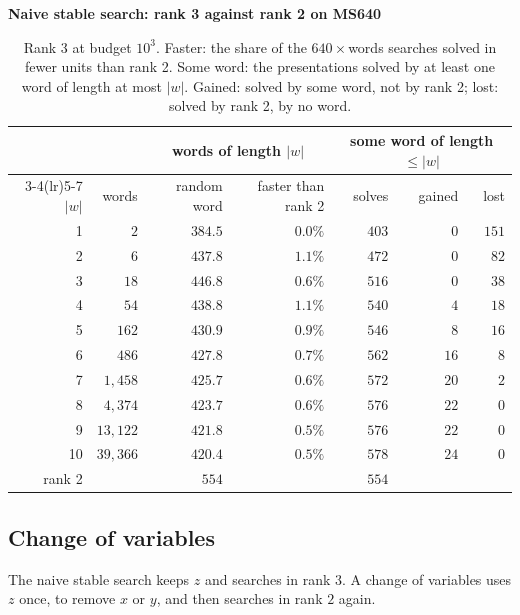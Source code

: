\documentclass[11pt]{article}
\theoremstyle{definition}
\theoremstyle{remark}
\begin{document}
\begin{table}[ht]
\centering
\small
\textbf{Naive stable search: rank 3 against rank 2 on MS640}\par\smallskip
\begin{tabular}{rrrrrrr}
\toprule
& & \multicolumn{2}{c}{words of length $|w|$} & \multicolumn{3}{c}{some word of length $\le|w|$}\\
\cmidrule(lr){3-4}\cmidrule(lr){5-7}
$|w|$ & words & random word & faster than rank 2 & solves & gained & lost\\
\midrule
1 & $2$ & $384.5$ & $0.0\%$ & $403$ & $0$ & $151$\\
2 & $6$ & $437.8$ & $1.1\%$ & $472$ & $0$ & $82$\\
3 & $18$ & $446.8$ & $0.6\%$ & $516$ & $0$ & $38$\\
4 & $54$ & $438.8$ & $1.1\%$ & $540$ & $4$ & $18$\\
5 & $162$ & $430.9$ & $0.9\%$ & $546$ & $8$ & $16$\\
6 & $486$ & $427.8$ & $0.7\%$ & $562$ & $16$ & $8$\\
7 & $1{,}458$ & $425.7$ & $0.6\%$ & $572$ & $20$ & $2$\\
8 & $4{,}374$ & $423.7$ & $0.6\%$ & $576$ & $22$ & $0$\\
9 & $13{,}122$ & $421.8$ & $0.5\%$ & $576$ & $22$ & $0$\\
10 & $39{,}366$ & $420.4$ & $0.5\%$ & $578$ & $24$ & $0$\\
\midrule
rank 2 & & $554$ & & $554$ & &\\
\bottomrule
\end{tabular}
\caption{Rank 3 at budget $10^3$. Faster: the share of the $640\times$words searches solved in fewer units than rank 2. Some word: the presentations solved by at least one word of length at most $|w|$. Gained: solved by some word, not by rank 2; lost: solved by
rank 2, by no word.}
\label{tab:stable_words}
\end{table}

\clearpage

\subsection{Change of variables}\label{sec:cov}

The naive stable search keeps $z$ and searches in rank $3$. A change of variables uses $z$ once, to remove $x$ or $y$,
and then searches in rank $2$ again.
\end{document}
